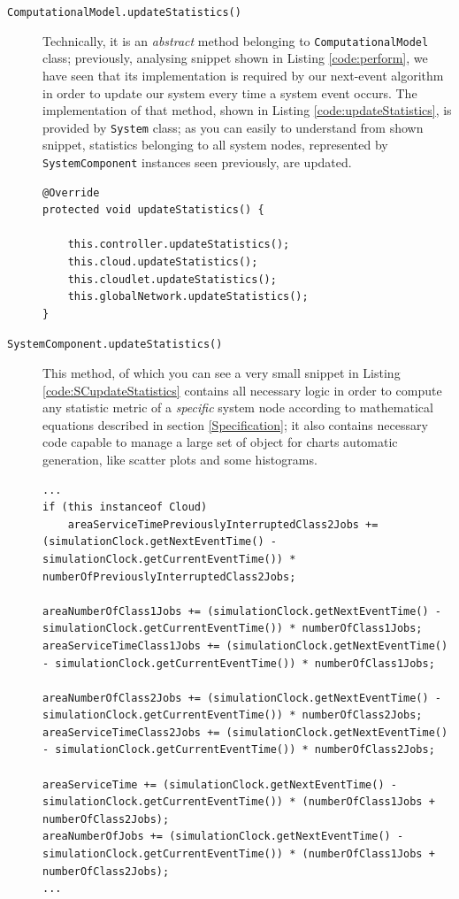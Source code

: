 \documentclass[10pt,a4paper]{article}
\begin{document}
\begin{description}
\item[\texttt{ComputationalModel.updateStatistics()}] Technically, it is an \textit{abstract} method belonging to \texttt{ComputationalModel} class; previously, analysing snippet shown in Listing \ref{code:perform}, we have seen that its implementation is required by our next-event algorithm in order to update our system every time a system event occurs. The implementation of that method, shown in Listing \ref{code:updateStatistics}, is provided by \texttt{System} class; as you can easily to understand from shown snippet, statistics belonging to all system nodes, represented by \texttt{SystemComponent} instances seen previously, are updated.

\begin{lstlisting}[frame=lines, caption={Snippet of \texttt{updateStatistics} method in \texttt{System} class}, label={code:updateStatistics}]
@Override
protected void updateStatistics() {

	this.controller.updateStatistics();
	this.cloud.updateStatistics();
	this.cloudlet.updateStatistics();
    this.globalNetwork.updateStatistics();
}
\end{lstlisting}

\item[\texttt{SystemComponent.updateStatistics()}] This method, of which you can see a very small snippet in Listing \ref{code:SCupdateStatistics} contains all necessary logic in order to compute any statistic metric of a \textit{specific} system node according to mathematical equations described in section \ref{Specification}; it also contains necessary code capable to manage a large set of object for charts automatic generation, like scatter plots and some histograms.

\begin{lstlisting}[frame=lines, caption={Snippet of \texttt{SystemComponent.updateStatistics} method}, label={code:SCupdateStatistics}]
...
if (this instanceof Cloud)
    areaServiceTimePreviouslyInterruptedClass2Jobs += (simulationClock.getNextEventTime() - simulationClock.getCurrentEventTime()) * numberOfPreviouslyInterruptedClass2Jobs;

areaNumberOfClass1Jobs += (simulationClock.getNextEventTime() - simulationClock.getCurrentEventTime()) * numberOfClass1Jobs;
areaServiceTimeClass1Jobs += (simulationClock.getNextEventTime() - simulationClock.getCurrentEventTime()) * numberOfClass1Jobs;

areaNumberOfClass2Jobs += (simulationClock.getNextEventTime() - simulationClock.getCurrentEventTime()) * numberOfClass2Jobs;
areaServiceTimeClass2Jobs += (simulationClock.getNextEventTime() - simulationClock.getCurrentEventTime()) * numberOfClass2Jobs;

areaServiceTime += (simulationClock.getNextEventTime() - simulationClock.getCurrentEventTime()) * (numberOfClass1Jobs + numberOfClass2Jobs);
areaNumberOfJobs += (simulationClock.getNextEventTime() - simulationClock.getCurrentEventTime()) * (numberOfClass1Jobs + numberOfClass2Jobs);
...
\end{lstlisting}

\end{description}
\end{document}
